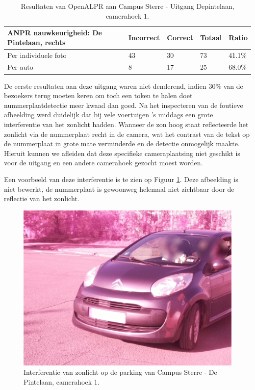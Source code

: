 \begin{table}[h!]
	\centering
	\begin{tabular}{l|l|l|l|l}
		\textbf{ANPR nauwkeurigheid: De Pintelaan, rechts} & Incorrect & Correct & Totaal & Ratio	\\ \hline
		Per individuele foto 	& 43	& 30	& 73 & 41.1\%\\
		Per auto				& 8	& 17 	& 25 & 68.0\%\\
	\end{tabular}
\caption{Resultaten van OpenALPR aan Campus Sterre - Uitgang Depintelaan, camerahoek 1.}
\label{tab:alprdepintelaan1}
\end{table}

De eerste resultaten aan deze uitgang waren niet denderend, indien 30\% van de bezoekers terug moeten keren om toch een token te halen doet nummerplaatdetectie meer kwaad dan goed. Na het inspecteren van de foutieve afbeelding werd duidelijk dat bij vele voertuigen 's middags een grote interferentie van het zonlicht hadden. Wanneer de zon hoog staat reflecteerde het zonlicht via de nummerplaat recht in de camera, wat het contrast van de tekst op de nummerplaat in grote mate verminderde en de detectie onmogelijk maakte. Hieruit kunnen we afleiden dat deze specifieke cameraplaatsing niet geschikt is voor de uitgang en een andere camerahoek gezocht moest worden. 

Een voorbeeld van deze interferentie is te zien op Figuur \ref{SterreZonlicht}. Deze afbeelding is niet bewerkt, de nummerplaat is gewoonweg helemaal niet zichtbaar door de reflectie van het zonlicht.
\begin{figure}[h!]
	\centering
	\includegraphics[width=0.8\linewidth]{img/sterre2zon.jpg}
	\caption{Interferentie van zonlicht op de parking van Campus Sterre - De Pintelaan, camerahoek 1.}
	\label{SterreZonlicht}
\end{figure}

